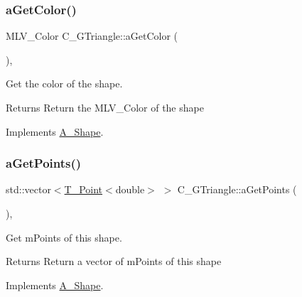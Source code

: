 \subsubsection{\texorpdfstring{a\+Get\+Color()}{aGetColor()}\hspace{0.1cm}{\footnotesize\ttfamily [2/2]}}
{\footnotesize\ttfamily M\+L\+V\+\_\+\+Color C\+\_\+\+G\+Triangle\+::a\+Get\+Color (\begin{DoxyParamCaption}{ }\end{DoxyParamCaption})\hspace{0.3cm}{\ttfamily [override]}, {\ttfamily [virtual]}}



Get the color of the shape. 

\begin{DoxyReturn}{Returns}
Return the M\+L\+V\+\_\+\+Color of the shape 
\end{DoxyReturn}


Implements \hyperlink{classA__Shape_a1e90c8132d33e4ac84d42f72606193b2}{A\+\_\+\+Shape}.

\mbox{\label{classC__GTriangle_aa18970aab947266cab2d4a9f664926a0}} 
\subsubsection{\texorpdfstring{a\+Get\+Points()}{aGetPoints()}\hspace{0.1cm}{\footnotesize\ttfamily [1/2]}}
{\footnotesize\ttfamily std\+::vector$<$\hyperlink{classT__Point}{T\+\_\+\+Point}$<$double$>$ $>$ C\+\_\+\+G\+Triangle\+::a\+Get\+Points (\begin{DoxyParamCaption}{ }\end{DoxyParamCaption})\hspace{0.3cm}{\ttfamily [override]}, {\ttfamily [virtual]}}



Get m\+Points of this shape. 

\begin{DoxyReturn}{Returns}
Return a vector of m\+Points of this shape 
\end{DoxyReturn}


Implements \hyperlink{classA__Shape_a9fd1285bd63b1fc88943c9969bf01a5c}{A\+\_\+\+Shape}.

\mbox{\label{classC__GTriangle_af3c514a6f5516c297374004a94788877}} 
